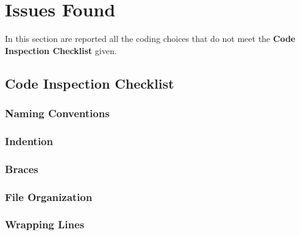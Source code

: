 \section{Issues Found}
In this section are reported all the coding choices that do not meet the \textbf{Code Inspection Checklist} given.

\subsection{Code Inspection Checklist}
\subsubsection{Naming Conventions}
\begin{itemize}
\end{itemize}

\subsubsection{Indention}
\begin{itemize}
\end{itemize}

\subsubsection{Braces}
\begin{itemize}
\end{itemize}

\subsubsection{File Organization}
\begin{itemize}
\end{itemize}

\subsubsection{Wrapping Lines}
\begin{itemize}
\end{itemize}

